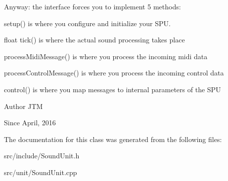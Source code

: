 Anyway\-: the interface forces you to implement 5 methods\-:


\begin{DoxyItemize}
\item setup() is where you configure and initialize your S\-P\-U.
\item float tick() is where the actual sound processing takes place
\item process\-Midi\-Message() is where you process the incoming midi data
\item process\-Control\-Message() is where you process the incoming control data
\item control() is where you map messages to internal parameters of the S\-P\-U
\end{DoxyItemize}

\begin{DoxyAuthor}{Author}
J\-T\-M 
\end{DoxyAuthor}
\begin{DoxySince}{Since}
April, 2016 
\end{DoxySince}


The documentation for this class was generated from the following files\-:\begin{DoxyCompactItemize}
\item 
src/include/Sound\-Unit.\-h\item 
src/unit/Sound\-Unit.\-cpp\end{DoxyCompactItemize}
